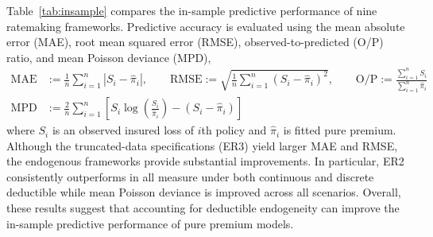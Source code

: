 \documentclass[11pt]{article}
\newcommand{\rev}[1]{{\color{blue}#1}}
\begin{document}
{\begin{table}[h!]
\centering
\caption{Goodness-of-fit of the frequency models}
\label{tab:Freqcopula}
\end{table}

\rev{Table~\ref{tab:insample} compares the in-sample predictive performance of nine ratemaking frameworks. Predictive accuracy is evaluated using the mean absolute error (MAE), root mean squared error (RMSE), observed-to-predicted (O/P) ratio, and mean Poisson deviance (MPD), 
\begin{align*}
\text{MAE}&:=\frac{1}{n}\sum_{i=1}^{n}\left|S_i-\hat\pi_i\right|,\qquad
\text{RMSE}:=\sqrt{\frac{1}{n}\sum_{i=1}^{n}(S_i-\hat\pi_i)^2},\qquad \text{O/P}:=\frac{\sum_{i=1}^{n}S_i}{\sum_{i=1}^{n}\hat\pi_i}\\
\text{MPD}&:=\frac{2}{n}\sum_{i=1}^{n}\left[S_i\log\left(\frac{S_i}{\widehat{\pi}_i}\right)-\left(S_i-\widehat{\pi}_i\right)\right]
\end{align*}
where $S_i$ is an observed insured loss of $i$th policy and $\hat{\pi}_i$ is fitted pure premium. Although the truncated-data specifications (ER3) yield larger MAE and RMSE, the endogenous frameworks provide substantial improvements. In particular, ER2 consistently outperforms in all measure under both continuous and discrete deductible while mean Poisson deviance is improved across all scenarios. Overall, these results suggest that accounting for deductible endogeneity can improve the in-sample predictive performance of pure premium models.} 

}
\end{document}
